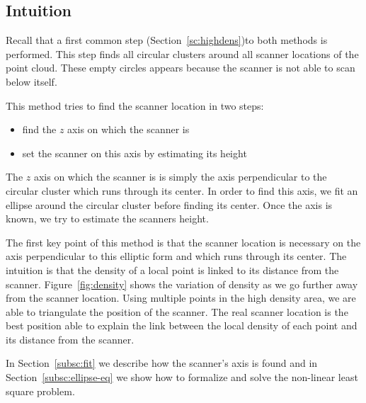 \subsection{Intuition}
Recall that a first common step (Section~\ref{sc:highdens})to both methods is performed. This step finds all  circular clusters around all scanner locations of the point cloud. These empty circles appears because the scanner is not able to scan below itself.

This method tries to find the scanner location in two steps:
\begin{itemize}
  \item find the $z$ axis on which the scanner is
  \item set the scanner on this axis by estimating its height
\end{itemize}

The $z$ axis on which the scanner is is simply the axis perpendicular to the circular cluster which runs through its center. In order to find this axis, we fit an ellipse around the circular cluster before finding its center. Once the axis is known, we try to estimate the scanners height.

The first key point of this method is that the scanner location is necessary on the axis perpendicular to this elliptic form and which runs through its center. The intuition is that the density of a local point is linked to its distance from the scanner. Figure~\ref{fig:density} shows the variation of density as we go further away from the scanner location. Using multiple points in the high density area, we are able to triangulate the position of the scanner. The real scanner location
is the best position able to explain the link between the local density of each point and its distance from the scanner.

In Section~\ref{subsc:fit} we describe how the scanner's axis is found and in  Section~\ref{subsc:ellipse-eq} we show how to formalize and solve the non-linear least square problem.


